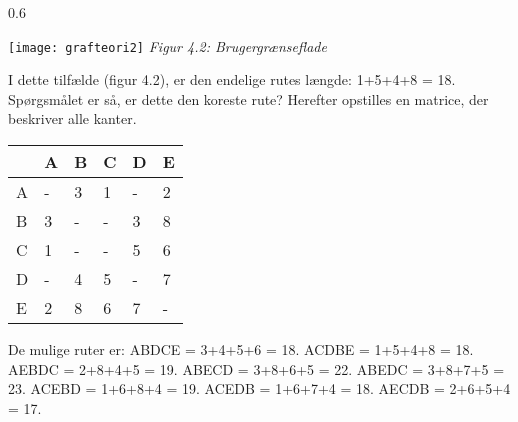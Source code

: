 
\begin{wrapfigure}{}{0.6\textwidth}
  \vspace{-20pt}
  \begin{center}
    \texttt{[image: grafteori2]} \newline
    \textit{Figur 4.2: Brugergrænseflade}\newline
  \end{center}
  \vspace{-20pt}
\end{wrapfigure}

I dette tilfælde (figur 4.2), er den endelige rutes længde: 1+5+4+8 = 18. Spørgsmålet er så, er dette den koreste rute? Herefter opstilles en matrice, der beskriver alle kanter.
\newpage

\begin{tabular}{| l | l | l | l | l | l |}
	\hline
	  & A & B & C & D & E \\ \hline
	A & - & 3 & 1 & - & 2 \\ \hline
	B & 3 & - & - & 3 & 8 \\ \hline
	C & 1 & - & - & 5 & 6 \\ \hline
	D & - & 4 & 5 & - & 7 \\ \hline
	E & 2 & 8 & 6 & 7 & - \\
	\hline
	\end{tabular}


De mulige ruter er: \newline
ABDCE = 3+4+5+6 = 18. \newline
ACDBE = 1+5+4+8 = 18. \newline
AEBDC = 2+8+4+5 = 19. \newline
ABECD = 3+8+6+5 = 22. \newline
ABEDC = 3+8+7+5 = 23. \newline
ACEBD = 1+6+8+4 = 19. \newline
ACEDB = 1+6+7+4 = 18. \newline
AECDB = 2+6+5+4 = 17. \newline

